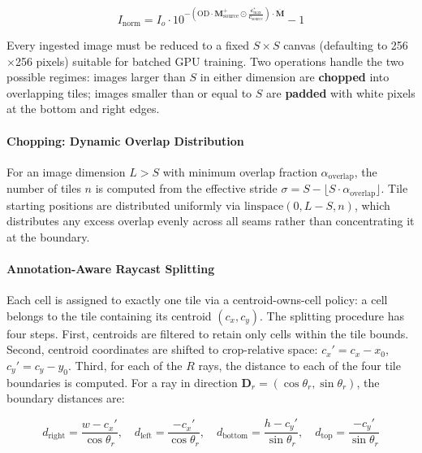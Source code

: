 \begin{equation}
    I_{\text{norm}} = I_o \cdot 10^{-\left(\text{OD} \cdot \mathbf{M}_{\text{source}}^+ \odot \frac{\mathbf{c}^*_{\max}}{\mathbf{c}_{\text{source}}}\right) \cdot \overline{\mathbf{M}}} - 1
\end{equation}



Every ingested image must be reduced to a fixed $S \times S$ canvas (defaulting to 256$\times$256 pixels) suitable for batched GPU training. Two operations handle the two possible regimes: images larger than $S$ in either dimension are \textbf{chopped} into overlapping tiles; images smaller than or equal to $S$ are \textbf{padded} with white pixels at the bottom and right edges.

\paragraph{Chopping: Dynamic Overlap Distribution}
For an image dimension $L > S$ with minimum overlap fraction $\alpha_{\text{overlap}}$, the number of tiles $n$ is computed from the effective stride $\sigma = S - \lfloor S \cdot \alpha_{\text{overlap}} \rfloor$. Tile starting positions are distributed uniformly via $\text{linspace}(0, L - S, n)$, which distributes any excess overlap evenly across all seams rather than concentrating it at the boundary.

\paragraph{Annotation-Aware Raycast Splitting}
Each cell is assigned to exactly one tile via a centroid-owns-cell policy: a cell belongs to the tile containing its centroid $(c_x, c_y)$. The splitting procedure has four steps. First, centroids are filtered to retain only cells within the tile bounds. Second, centroid coordinates are shifted to crop-relative space: $c_x' = c_x - x_0$, $c_y' = c_y - y_0$. Third, for each of the $R$ rays, the distance to each of the four tile boundaries is computed. For a ray in direction $\mathbf{D}_r = (\cos\theta_r, \sin\theta_r)$, the boundary distances are:

\begin{equation}
    d_{\text{right}} = \frac{w - c_x'}{\cos\theta_r},\quad
    d_{\text{left}}  = \frac{-c_x'}{\cos\theta_r},\quad
    d_{\text{bottom}} = \frac{h - c_y'}{\sin\theta_r},\quad
    d_{\text{top}}    = \frac{-c_y'}{\sin\theta_r}
\end{equation}

